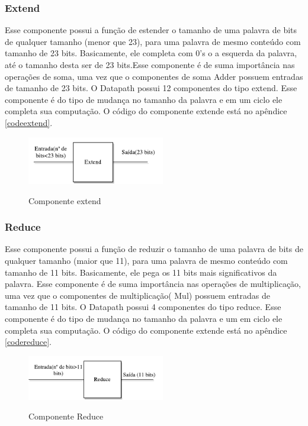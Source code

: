 \subsubsection{Extend}
Esse componente possui a função de estender o tamanho de uma palavra de bits de qualquer tamanho (menor que 23), para uma palavra de mesmo conteúdo com tamanho de 23 bits. Basicamente, ele completa com 0's o a esquerda da palavra, até o tamanho desta ser de 23 bits.Esse componente é de suma importância nas operações de soma, uma vez que o componentes de soma Adder  possuem entradas de tamanho de 23 bits. O Datapath possui 12 componentes do tipo extend. Esse componente é do tipo de mudança no tamanho da palavra e em um ciclo ele completa sua computação. O código do componente extende está no apêndice \ref{codeextend}.


\begin{figure}[H]
	\centering
	\includegraphics[width=6cm]{figures/Extend.pdf}\\
	\caption{Componente extend}
	\label{extend}
\end{figure}


\subsubsection{Reduce}
Esse componente possui a função de reduzir o tamanho de uma palavra de bits de qualquer tamanho (maior que 11), para uma palavra de mesmo conteúdo com tamanho de 11 bits. Basicamente, ele pega os 11 bits mais significativos da palavra. Esse componente é de suma importância nas operações de multiplicação, uma vez que o componentes de multiplicação( Mul) possuem entradas de tamanho de 11 bits. O Datapath possui 4 componentes do tipo reduce. Esse componente é do tipo de mudança no tamanho da palavra e um em ciclo ele completa sua computação. O código do componente extende está no apêndice \ref{codereduce}.


\begin{figure}[H]
	\centering
	\includegraphics[width=6cm]{figures/Reduce.pdf}\\
	\caption{Componente Reduce}
	\label{reduce}
\end{figure}



